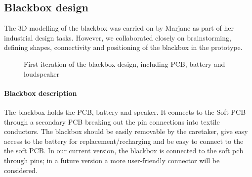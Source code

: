 \subsection{Blackbox design}
The 3D modelling of the blackbox was carried on by Marjane as part of her industrial design tasks. However, we collaborated closely on brainstorming, defining shapes, connectivity and positioning of the blackbox in the prototype. 

\begin{figure}[ht]
    \centering
    \hfill
    \hfill
    \caption{First iteration of the blackbox design, including PCB, battery and loudspeaker}
    \label{fig:blackbox}
\end{figure}

\paragraph{Blackbox description} The blackbox holds the PCB, battery and speaker. It connects
to the Soft PCB through a secondary PCB breaking out the pin connections into textile conductors. The blackbox should be easily removable by the caretaker, give easy access to the battery for replacement/recharging and be easy to connect to the the soft PCB. In our current version, the blackbox is connected to the soft pcb through pins; in a future version a more user-friendly connector will be considered.

